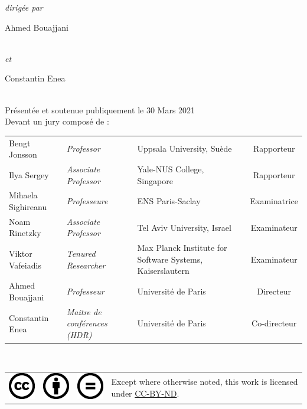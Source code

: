 \begin{titlepage}
\begin{center}
    \vspace{0.7cm}
    \emph{dirigée par}\\
    \vspace{0.1cm}
    \begin{Large}Ahmed Bouajjani\end{Large}\\
    \emph{et}\\
    \begin{Large}Constantin Enea\end{Large}\\
    \vspace{0.5cm}
    Présentée et soutenue publiquement le 30 Mars 2021\\
    \vspace{0.1cm}
    Devant un jury composé de :\\
    \vspace{0.5cm}
    \begin{tabular}{lp{9em}p{12em}c}
    Bengt Jonsson & \emph{Professor} & Uppsala University, Suède & Rapporteur\\
    Ilya Sergey & \emph{Associate Professor} & Yale-NUS College, Singapore & Rapporteur\\
    Mihaela Sighireanu & \emph{Professeure} & ENS Paris-Saclay & Examinatrice\\
    Noam Rinetzky & \emph{Associate Professor} & Tel Aviv University, Israel & Examinateur\\
    Viktor Vafeiadis & \emph{Tenured Researcher} & Max Planck Institute for Software Systems, Kaiserslautern & Examinateur\\
    Ahmed Bouajjani & \emph{Professeur} & Université de Paris & Directeur\\
    Constantin Enea & \emph{Maitre de conférences (HDR)} & Université de Paris & Co-directeur\\
    \end{tabular}\\
    \vfill
    \begin{tabular}{cccb{12em}}
      \includegraphics[scale=.5]{assets/cc.png} & \includegraphics[scale=.5]{assets/by.png} & \includegraphics[scale=.5]{assets/nd.png} & Except where otherwise noted, this work is licensed under \href{https://creativecommons.org/licenses/by-nd/4.0}{CC-BY-ND}.\\
    \end{tabular}
  \end{center}
  \makeatother
\end{titlepage}
\newpage
\null
\thispagestyle{empty}
\newpage
